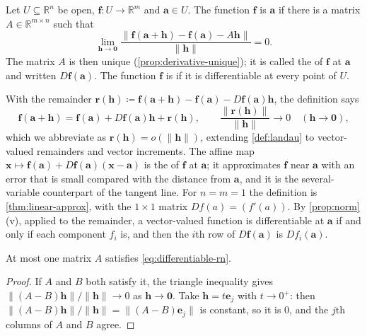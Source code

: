 \begin{definition}[Differentiability]
\label{def:differentiable-rn}
Let $U\subseteq\mathbb R^n$ be open, $\mathbf f\colon U\to\mathbb R^m$ and $\mathbf a\in U$. The function $\mathbf f$ is  $\mathbf a$ if there is a matrix $A\in\mathbb R^{m\times n}$ such that
\begin{equation}
\lim_{\mathbf h\to\mathbf0}\frac{\|\mathbf f(\mathbf a+\mathbf h)-\mathbf f(\mathbf a)-A\mathbf h\|}{\|\mathbf h\|}=0 .
\label{eq:differentiable-rn}
\end{equation}
The matrix $A$ is then unique (\cref{prop:derivative-unique}); it is called the  of $\mathbf f$ at $\mathbf a$ and written $D\mathbf f(\mathbf a)$. The function $\mathbf f$ is  if it is differentiable at every point of $U$.
\end{definition}

With the remainder $\mathbf r(\mathbf h)\coloneqq\mathbf f(\mathbf a+\mathbf h)-\mathbf f(\mathbf a)-D\mathbf f(\mathbf a)\mathbf h$, the definition says
\[
\mathbf f(\mathbf a+\mathbf h)=\mathbf f(\mathbf a)+D\mathbf f(\mathbf a)\mathbf h+\mathbf r(\mathbf h),\qquad\frac{\|\mathbf r(\mathbf h)\|}{\|\mathbf h\|}\to0\quad(\mathbf h\to\mathbf0),
\]
which we abbreviate as $\mathbf r(\mathbf h)=o(\|\mathbf h\|)$, extending \cref{def:landau} to vector-valued remainders and vector increments. The affine map $\mathbf x\mapsto\mathbf f(\mathbf a)+D\mathbf f(\mathbf a)(\mathbf x-\mathbf a)$ is the  of $\mathbf f$ at $\mathbf a$; it approximates $\mathbf f$ near $\mathbf a$ with an error that is small compared with the distance from $\mathbf a$, and it is the several-variable counterpart of the tangent line. For $n=m=1$ the definition is \cref{thm:linear-approx}, with the $1\times1$ matrix $D f(a)=(f'(a))$. By \cref{prop:norm}\,(v), applied to the remainder, a vector-valued function is differentiable at $\mathbf a$ if and only if each component $f_i$ is, and then the $i$th row of $D\mathbf f(\mathbf a)$ is $Df_i(\mathbf a)$.

\begin{proposition}
\label{prop:derivative-unique}
At most one matrix $A$ satisfies \eqref{eq:differentiable-rn}.
\end{proposition}

\begin{proof}
If $A$ and $B$ both satisfy it, the triangle inequality gives $\|(A-B)\mathbf h\|/\|\mathbf h\|\to0$ as $\mathbf h\to\mathbf0$. Take $\mathbf h=t\mathbf e_j$ with $t\to0^+$: then $\|(A-B)\mathbf h\|/\|\mathbf h\|=\|(A-B)\mathbf e_j\|$ is constant, so it is $0$, and the $j$th columns of $A$ and $B$ agree.
\end{proof}

